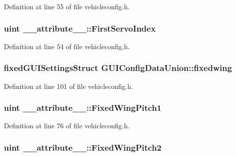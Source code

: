 \-Definition at line 55 of file vehicleconfig.\-h.

\hypertarget{group___config_plugin_ga7db78067a379a075d4ead422019337d3}{
\subsubsection[{\-First\-Servo\-Index}]{\setlength{\rightskip}{0pt plus 5cm}uint {\bf \-\_\-\-\_\-attribute\-\_\-\-\_\-\-::\-First\-Servo\-Index}}}\label{group___config_plugin_ga7db78067a379a075d4ead422019337d3}


\-Definition at line 54 of file vehicleconfig.\-h.

\hypertarget{group___config_plugin_ga10cc00a6af97a84e5f17358ed3c5eb34}{
\subsubsection[{fixedwing}]{\setlength{\rightskip}{0pt plus 5cm}fixed\-G\-U\-I\-Settings\-Struct {\bf \-G\-U\-I\-Config\-Data\-Union\-::fixedwing}}}\label{group___config_plugin_ga10cc00a6af97a84e5f17358ed3c5eb34}


\-Definition at line 101 of file vehicleconfig.\-h.

\hypertarget{group___config_plugin_ga13162fedce809405cef3920e6e81a8bc}{
\subsubsection[{\-Fixed\-Wing\-Pitch1}]{\setlength{\rightskip}{0pt plus 5cm}uint {\bf \-\_\-\-\_\-attribute\-\_\-\-\_\-\-::\-Fixed\-Wing\-Pitch1}}}\label{group___config_plugin_ga13162fedce809405cef3920e6e81a8bc}


\-Definition at line 76 of file vehicleconfig.\-h.

\hypertarget{group___config_plugin_gaeef8404a3e1d41f57ce18b8e9b351a2d}{
\subsubsection[{\-Fixed\-Wing\-Pitch2}]{\setlength{\rightskip}{0pt plus 5cm}uint {\bf \-\_\-\-\_\-attribute\-\_\-\-\_\-\-::\-Fixed\-Wing\-Pitch2}}}\label{group___config_plugin_gaeef8404a3e1d41f57ce18b8e9b351a2d}


